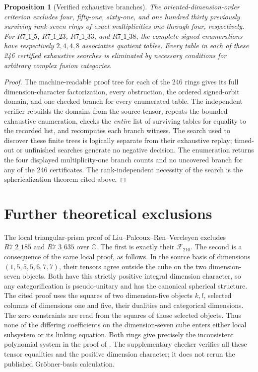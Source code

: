 \documentclass[11pt]{article}
\newtheorem{proposition}[theorem]{Proposition}
\newcommand{\C}{\mathbb C}
\begin{document}
\begin{proposition}[Verified exhaustive branches]
The oriented-dimension-order criterion excludes four, fifty-one,
sixty-one, and one hundred thirty previously surviving rank-seven
rings of exact multiplicities one through four, respectively.
For $R7\_1\_5$, $R7\_1\_23$, $R7\_1\_33$, and $R7\_1\_38$,
the complete signed enumerations have respectively $2,4,4,8$
associative quotient tables. Every table in each of these 246
certified exhaustive searches is eliminated by necessary conditions
for arbitrary complex fusion categories.
\end{proposition}
\begin{proof}
The machine-readable proof tree for each of the 246 rings gives its full
dimension-character factorization, every obstruction, the ordered
signed-orbit domain, and one checked branch for every enumerated
table. The independent verifier rebuilds the domains from the source
tensor, repeats the bounded exhaustive enumeration, checks the
\emph{entire} list of surviving tables for equality to the recorded
list, and recomputes each branch witness. The search used to discover
these finite trees is logically separate from their exhaustive replay;
timed-out or unfinished searches generate no negative decision.
The enumeration returns the four displayed multiplicity-one branch
counts and no uncovered branch for any of the 246 certificates.
The rank-independent necessity of the search is the
sphericalization theorem cited above.
\end{proof}

\section{Further theoretical exclusions}
The local triangular-prism proof of Liu--Palcoux--Ren--Vercleyen
\cite[Corollary~6.2, Theorem~6.4 and Theorem~7.2]{TPE}
excludes $R7\_2\_185$ and $R7\_3\_635$ over $\C$.
The first is exactly their $\mathcal F_{210}$.
The second is a consequence of the same local proof, as follows.
In the source basis of dimensions $(1,5,5,5,6,7,7)$, their tensors agree
outside the cube on the two dimension-seven objects. Both have this
strictly positive integral dimension character, so any categorification
is pseudo-unitary and has the canonical spherical structure.
The cited proof uses the squares of two dimension-five objects $k,l$,
selected columns of dimensions one and five, their dualities and
categorical dimensions. The zero constraints are read from the squares
of those selected objects. Thus none of the differing coefficients on
the dimension-seven cube enters either local subsystem or its linking
equation. Both rings give precisely the inconsistent polynomial system
in the proof of \cite[Theorem~7.2]{TPE}. The supplementary checker
verifies all these tensor equalities and the positive dimension
character; it does not rerun the published Gr\"obner-basis calculation.
\end{document}

